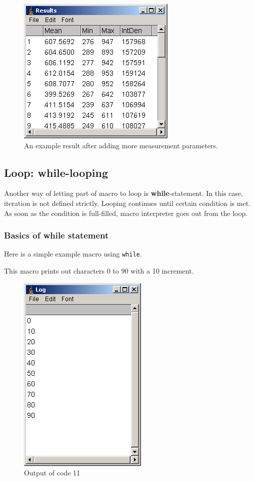 \documentclass[11pt,a4paper,oneside]{report}
\newcommand{\ilcom}[1]{\texttt{\small#1}}
\begin{document}
\begin{figure}[htbp]
\begin{center}
\includegraphics[scale=0.5]{fig/fig2322_moreResultsTable.png}
\caption{An example result after adding more measurement parameters.}
\label{fig_MoreMeasurementPara}
\end{center}
\end{figure} 

\subsection{Loop: while-looping}

Another way of letting part of macro to loop is \textbf{while}-statement. In this case, iteration is not defined strictly. Looping continues until certain condition is met. As soon as the condition is full-filled, macro interpreter goes out from the loop.

\subsubsection{Basics of while statement}
Here is a simple example macro using \ilcom{while}.

This macro prints out characters 0 to 90 with a 10 increment. 

\begin{figure}[htbp]
\begin{center}
\includegraphics[scale=0.4]{fig/fig2331_Code11out.png}
\caption{Output of code 11}
\label{fig:code11 output}
\end{center}
\end{figure} 
\end{document}
